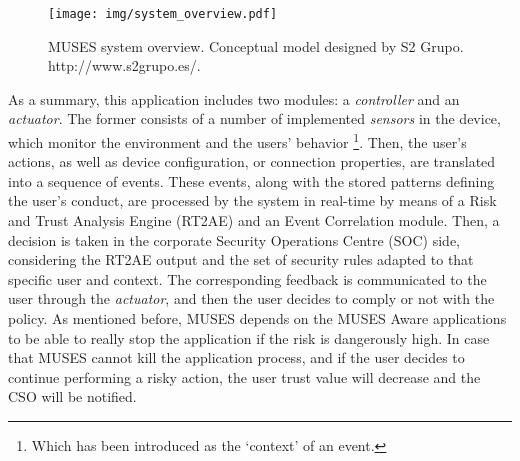 \begin{figure}[ht]
\centering
\texttt{[image: img/system\_overview.pdf]}
\caption{MUSES system overview. Conceptual model designed by S2 Grupo.  http://www.s2grupo.es/.\label{fig:system_overview}}
\end{figure}

As a summary, this application includes two modules: a \textit{controller} and an \textit{actuator}. The former consists of a number of implemented \textit{sensors} in the device, which monitor the environment and the users' behavior \footnote{Which has been introduced as the `context' of an event.}. Then, the user's actions, as well as device configuration, or connection properties, are translated into a sequence of events. These events, along with the stored patterns defining the user's conduct, are processed by the system in real-time by means of a Risk and Trust Analysis Engine (RT2AE) and an Event Correlation module. Then, a decision is taken in the corporate Security Operations Centre (SOC) side, considering the RT2AE output and the set of security rules adapted to that specific user and context. The corresponding feedback is communicated to the user through the \textit{actuator}, and then the user decides to comply or not with the policy. As mentioned before, MUSES depends on the MUSES Aware applications to be able to really stop the application if the risk is dangerously high. In case that MUSES cannot kill the application process, and if the user decides to continue performing a risky action, the user trust value will decrease and the CSO will be notified.

